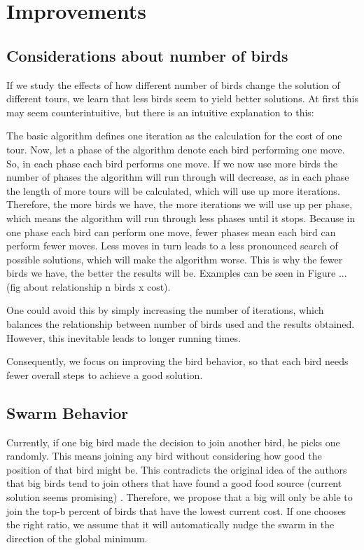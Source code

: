 \section{Improvements} \label{Improvements}
\subsection{Considerations about number of birds}
If we study the effects of how different number of birds change the solution of different tours, we learn that less birds seem to yield better solutions. At first this may seem counterintuitive, but there is an intuitive explanation to this:

The basic algorithm defines one iteration as the calculation for the cost of one tour. Now, let a phase of the algorithm denote each bird performing one move. So, in each phase each bird performs one move.
If we now use more birds the number of phases the algorithm will run through will decrease, as in each phase the length of more tours will be calculated, which will use up more iterations. Therefore, the more birds we have, the more iterations we will use up per phase, which means the algorithm will run through less phases until it stops. 
Because in one phase each bird can perform one move, fewer phases mean each bird can perform fewer moves. 
Less moves in turn leads to a less pronounced search of possible solutions,
which will make the algorithm worse.
This is why the fewer birds we have, the better the results will be.
Examples can be seen in Figure ... (fig about relationship n birds x cost).

One could avoid this by simply increasing the number of iterations,
which balances the relationship between number of birds used and the results obtained.
However, this inevitable leads to longer running times.

Consequently, we focus on improving the bird behavior,
so that each bird needs fewer overall steps to achieve a good solution.

\subsection{Swarm Behavior} \label{Swarm Behavior}
Currently, if one big bird made the decision to join another bird, he picks one randomly.
This means joining any bird without considering how good the position of that bird might be. This contradicts the original idea of the authors that big birds tend to join others that have found a good food source (current solution seems promising) \cite{afb}.
Therefore, we propose that a big will only be able to join the top-b percent of birds that have the lowest current cost. If one chooses the right ratio, we assume that it will automatically nudge the swarm in the direction of the global minimum.

